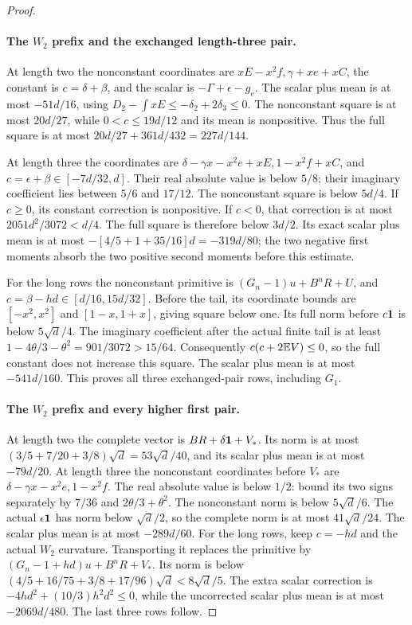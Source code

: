 \begin{proof}
\paragraph{The \(W_2\) prefix and the exchanged length-three pair.}
\label{part:odd-two:w2-three}
At length two the nonconstant coordinates are
\(xE-x^2f,\gamma+xe+xC\), the constant is
\(c=\delta+\beta\), and the scalar is
\(-\Gamma+\epsilon-g_e\).
The scalar plus mean is at most \(-51d/16\), using
\(D_2-\int xE\le-\delta_2+2\delta_3\le0\).
The nonconstant square is at most \(20d/27\), while
\(0<c\le19d/12\) and its mean is nonpositive. Thus the full
square is at most \(20d/27+361d/432=227d/144\).

At length three the coordinates are
\(\delta-\gamma x-x^2e+xE,1-x^2f+xC\), and
\(c=\epsilon+\beta\in[-7d/32,d]\).
Their real absolute value is below \(5/8\); their imaginary
coefficient lies between \(5/6\) and \(17/12\).
The nonconstant square is below \(5d/4\). If \(c\ge0\), its
constant correction is nonpositive. If \(c<0\), that correction
is at most \(2051d^2/3072<d/4\). The full square is therefore
below \(3d/2\). Its exact scalar plus mean is at most
\(-[4/5+1+35/16]d=-319d/80\); the two negative first moments
absorb the two positive second moments before this estimate.

For the long rows the nonconstant primitive is
\((G_n-1)u+B^nR+U\), and \(c=\beta-hd\in[d/16,15d/32]\).
Before the tail, its coordinate bounds are
\([-x^2,x^2]\) and \([1-x,1+x]\), giving square below one.
Its full norm before \(c\mathbf1\) is below \(5\sqrt d/4\).
The imaginary coefficient after the actual finite tail is at least
\(1-4\theta/3-\theta^2=901/3072>15/64\).
Consequently \(c(c+2\mathbb E V)\le0\), so the full constant does not
increase this square. The scalar plus mean is at most \(-541d/160\).
This proves all three exchanged-pair rows, including \(G_1\).

\paragraph{The \(W_2\) prefix and every higher first pair.}
\label{part:odd-two:w2-higher}
At length two the complete vector is \(BR+\delta\mathbf1+V_*\).
Its norm is at most \((3/5+7/20+3/8)\sqrt d=53\sqrt d/40\),
and its scalar plus mean is at most \(-79d/20\).
At length three the nonconstant coordinates before \(V_*\) are
\(\delta-\gamma x-x^2e,1-x^2f\).
The real absolute value is below \(1/2\): bound its two signs
separately by \(7/36\) and \(2\theta/3+\theta^2\).
The nonconstant norm is below \(5\sqrt d/6\).
The actual \(\epsilon\mathbf1\) has norm below \(\sqrt d/2\),
so the complete norm is at most \(41\sqrt d/24\).
The scalar plus mean is at most \(-289d/60\).
For the long rows, keep \(c=-hd\) and the actual \(W_2\) curvature.
Transporting it replaces the primitive by
\((G_n-1+hd)u+B^nR+V_*\). Its norm is below
\((4/5+16/75+3/8+17/96)\sqrt d<8\sqrt d/5\).
The extra scalar correction is
\(-4hd^2+(10/3)h^2d^2\le0\), while the uncorrected scalar
plus mean is at most \(-2069d/480\). The last three rows follow.


\end{proof}
